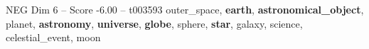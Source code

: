 \begin{textsample}{NEG Dim 6 – Score -6.00 – t003593}  \label{ex:f6_neg_034}
outer\_space, \textbf{earth}, \textbf{astronomical\_object}, planet, \textbf{astronomy}, \textbf{universe}, \textbf{globe}, sphere, \textbf{star}, galaxy, science, celestial\_event, moon

\end{textsample}
